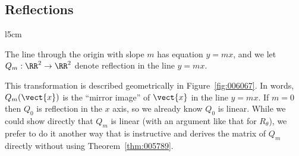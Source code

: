 \subsection*{Reflections}

\begin{wrapfigure}[10]{l}{5cm} 
	\centering
	
	\caption{\label{fig:006067}}
\end{wrapfigure}

The line through the origin with slope $m$ has equation $y = mx$, and we let $Q_{m} : \RR^2 \to \RR^2$ denote reflection in the line $y = mx$.

This transformation is described geometrically in Figure~\ref{fig:006067}. In words, $Q_{m}(\vect{x})$ is the ``mirror image'' of $\vect{x}$ in the line $y = mx$. If $m = 0$ then $Q_{0}$ is reflection in the $x$ axis, so we already know $Q_{0}$ is linear. While we could show directly that $Q_{m}$ is linear (with an argument like that for $R_{\theta}$), we prefer to do it another way that is instructive and derives the matrix of $Q_{m}$ directly without using Theorem~\ref{thm:005789}.

